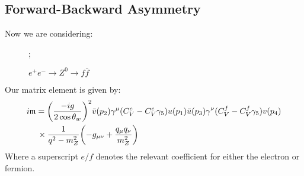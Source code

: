 \documentclass[12pt]{article}
\newcommand{\g}{\gamma}
\renewcommand{\u}[1]{{u(#1)}}
\newcommand{\ub}[1]{{\bar u(#1)}}
\renewcommand{\v}[1]{{v(#1)}}
\renewcommand{\vb}[1]{{\bar v(#1)}}
\newcommand{\munu}{{\mu\nu}}
\begin{document}
\subsection{Forward-Backward Asymmetry}
Now we are considering:
\begin{figure}[H]
  \centering
  ;
  \caption{$e^+e^-\to Z^0\to f\bar f$}
  \label{fig:4}
\end{figure}
Our matrix element is given by:
\begin{align*}
  i\mathfrak{m}&=\qty(\frac{-ig}{2\cos\theta_w})^2\vb{p_2}\g^\mu(C_V^e-C_V^e\g_5)
  \u{p_1}\ub{p_3}\g^\nu(C_V^f-C_V^f\g_5)\v{p_4}\\
  &\,\times\frac{1}{q^2-m_Z^2}
  \qty(-g_\munu+\frac{q_\mu q_\nu}{m_Z^2})
\end{align*}
Where a superscript $e/f$ denotes the relevant coefficient for either the electron or fermion.
\end{document}
